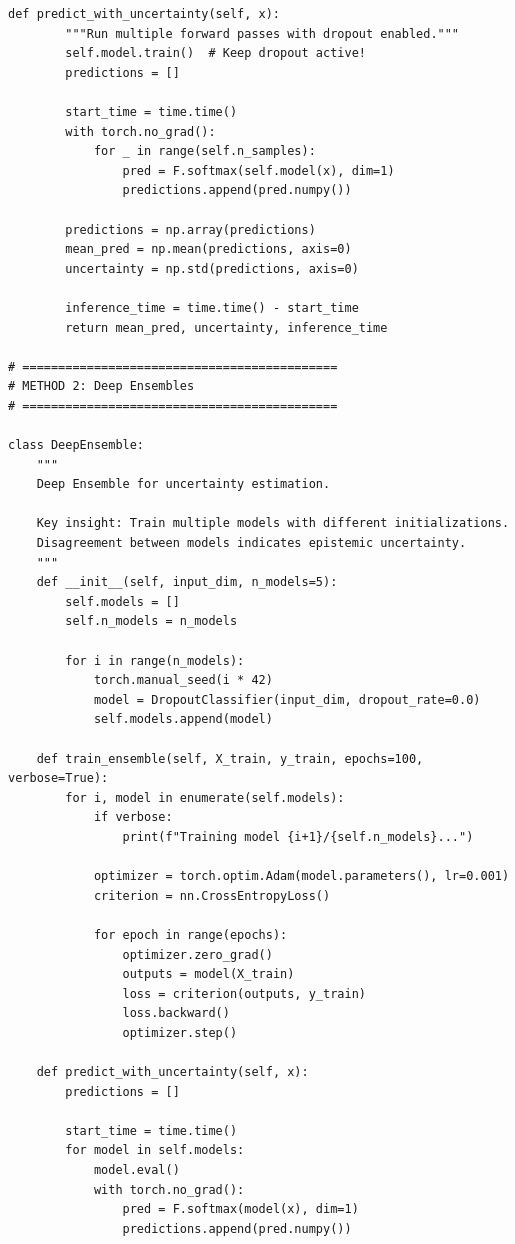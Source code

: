 \begin{lstlisting}[style=python, caption={Complete uncertainty estimation implementation}]
    def predict_with_uncertainty(self, x):
        """Run multiple forward passes with dropout enabled."""
        self.model.train()  # Keep dropout active!
        predictions = []

        start_time = time.time()
        with torch.no_grad():
            for _ in range(self.n_samples):
                pred = F.softmax(self.model(x), dim=1)
                predictions.append(pred.numpy())

        predictions = np.array(predictions)
        mean_pred = np.mean(predictions, axis=0)
        uncertainty = np.std(predictions, axis=0)

        inference_time = time.time() - start_time
        return mean_pred, uncertainty, inference_time

# ============================================
# METHOD 2: Deep Ensembles
# ============================================

class DeepEnsemble:
    """
    Deep Ensemble for uncertainty estimation.

    Key insight: Train multiple models with different initializations.
    Disagreement between models indicates epistemic uncertainty.
    """
    def __init__(self, input_dim, n_models=5):
        self.models = []
        self.n_models = n_models

        for i in range(n_models):
            torch.manual_seed(i * 42)
            model = DropoutClassifier(input_dim, dropout_rate=0.0)
            self.models.append(model)

    def train_ensemble(self, X_train, y_train, epochs=100, verbose=True):
        for i, model in enumerate(self.models):
            if verbose:
                print(f"Training model {i+1}/{self.n_models}...")

            optimizer = torch.optim.Adam(model.parameters(), lr=0.001)
            criterion = nn.CrossEntropyLoss()

            for epoch in range(epochs):
                optimizer.zero_grad()
                outputs = model(X_train)
                loss = criterion(outputs, y_train)
                loss.backward()
                optimizer.step()

    def predict_with_uncertainty(self, x):
        predictions = []

        start_time = time.time()
        for model in self.models:
            model.eval()
            with torch.no_grad():
                pred = F.softmax(model(x), dim=1)
                predictions.append(pred.numpy())


\end{lstlisting}
